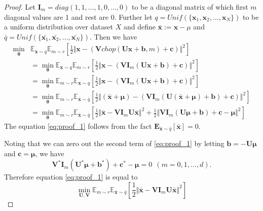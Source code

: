 \documentclass{article}
\begin{document}
    \begin{proof}
      Let $\mathbf{I}_m = diag(1, 1, \dots, 1, 0, \dots, 0)$ to be a diagonal matrix of which first $m$ diagonal values are 1 and rest are 0. Further let $q = Unif(\{\mathbf{x}_1, \mathbf{x}_2, \dots, \mathbf{x}_N\})$ to be a uniform distribution over dataset $X$ and define $\bar{\mathbf{x}} := \mathbf{x} - \mu$ and $\bar{q} = Unif(\{ \bar{\mathbf{x}_1}, \bar{\mathbf{x}_2}, \dots, \bar{\mathbf{x}_N} \})$. Then we have
      \begin{align}      
        \min_\mathbf{\theta} & \mathbb{E}_{\mathbf{x} \sim q} \mathbb{E}_{m \sim r} \left[ \frac{1}{2} \Vert \mathbf{x} - (\mathbf{V} chop(\mathbf{U}\mathbf{x} + \mathbf{b}, m) + \mathbf{c})  \Vert ^2 \right] \nonumber \\
        &= \min_\mathbf{\theta} \mathbb{E}_{\mathbf{x} \sim q} \mathbb{E}_{m \sim r} \left[ \frac{1}{2} \Vert \mathbf{x} - \left(\mathbf{V} \mathbf{I}_m (\mathbf{U} \mathbf{x} + \mathbf{b}) + \mathbf{c} \right)  \Vert ^2 \right] \nonumber \\
        &= \min_\mathbf{\theta} \mathbb{E}_{m \sim r} \mathbb{E}_{\mathbf{x} \sim q} \left[ \frac{1}{2} \Vert \mathbf{x} - \left(\mathbf{V} \mathbf{I}_m (\mathbf{U} \mathbf{x} + \mathbf{b}) + \mathbf{c} \right)  \Vert ^2 \right] \nonumber \\
        &= \min_\mathbf{\theta} \mathbb{E}_{m \sim r} \mathbb{E}_{\bar{\mathbf{x}} \sim \bar{q}} \left[ \frac{1}{2} \Vert (\bar{\mathbf{x}} + \mathbf{\mu}) - \left(\mathbf{V} \mathbf{I}_m (\mathbf{U} (\bar{\mathbf{x}} + \mathbf{\mu}) + \mathbf{b}) + \mathbf{c} \right)  \Vert ^2 \right] \nonumber \\       
        &= \min_\mathbf{\theta} \mathbb{E}_{m \sim r} \mathbb{E}_{\bar{\mathbf{x}} \sim \bar{q}} \left[ \frac{1}{2} \Vert \bar{\mathbf{x}} - \mathbf{V} \mathbf{I}_m \mathbf{U} \bar{\mathbf{x}} \Vert^2 
        + \frac{1}{2} \Vert \mathbf{V} \mathbf{I}_m (\mathbf{U} \mathbf{\mu} + \mathbf{b}) + \mathbf{c} - \mathbf{\mu} \Vert ^2 \right] \label{eq:proof_1}        
      \end{align}
      The equation \ref{eq:proof_1} follows from the fact $\mathbf{E}_{\bar{\mathbf{x}} \sim \bar{q}}[\bar{\mathbf{x}}] = 0$. 
      
      Noting that we can zero out the second term of \ref{eq:proof_1} by letting $\mathbf{b} = -\mathbf{U} \mathbf{\mu}$ and $\mathbf{c} = \mathbf{\mu}$, we have
      \begin{equation}
        \mathbf{V^\ast} \mathbf{I}_m (\mathbf{U^\ast} \mathbf{\mu} + \mathbf{b^\ast}) + \mathbf{c^\ast} - \mathbf{\mu}  = 0 \ \ (m=0, 1, \dots,d). \label{eq:proof_2}
      \end{equation}      
      Therefore equation \ref{eq:proof_1} is equal to
      \begin{equation}
      \min_{\mathbf{U}, \mathbf{V}} \mathbb{E}_{m \sim r} \mathbb{E}_{\bar{\mathbf{x}} \sim \bar{q}} \left[ \frac{1}{2} \Vert \bar{\mathbf{x}} - \mathbf{V} \mathbf{I}_m \mathbf{U} \bar{\mathbf{x}} \Vert^2 \right]  \label{eq:proof_3}
      \end{equation}


\end{proof}
\end{document}
